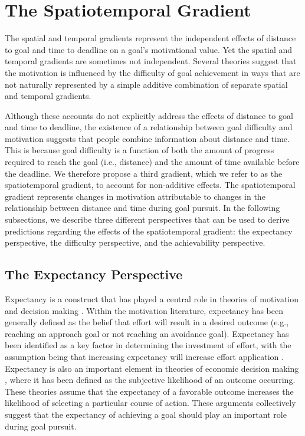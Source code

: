 \documentclass[a4paper,doc,natbib,donotrepeattitle]{apa6}
\begin{document}
\section{The Spatiotemporal Gradient}

The spatial and temporal gradients represent the independent effects of distance to goal and time to deadline on a goal's motivational value. Yet the spatial and temporal gradients are sometimes not independent. Several theories suggest that the motivation is influenced by the difficulty of goal achievement in ways that are not naturally represented by a simple additive combination of separate spatial and temporal gradients.

Although these accounts do not explicitly address the effects of distance to goal and time to deadline, the existence of a relationship between goal difficulty and motivation suggests that people combine information about distance and time. This is because goal difficulty is a function of both the amount of progress required to reach the goal (i.e., distance) and the amount of time available before the deadline. We therefore propose a third gradient, which we refer to as the spatiotemporal gradient, to account for non-additive effects. The spatiotemporal gradient represents changes in motivation attributable to changes in the relationship between distance and time during goal pursuit. In the following subsections, we describe three different perspectives that can be used to derive predictions regarding the effects of the spatiotemporal gradient: the expectancy perspective, the difficulty perspective, and the achievability perspective.

\subsection{The Expectancy Perspective}

Expectancy is a construct that has played a central role in theories of motivation and decision making \citep{Vroom1964,Bandura1977}. Within the motivation literature, expectancy has been generally defined as the belief that effort will result in a desired outcome (e.g., reaching an approach goal or not reaching an avoidance goal). Expectancy has been identified as a key factor in determining the investment of effort, with the assumption being that increasing expectancy will increase effort application \citep{Locke1990,Bandura1977,Vroom1964,Steel2006}. Expectancy is also an important element in theories of economic decision making \citep[e.g.,][]{vonNeumann1947,Luce1957}, where it has been defined as the subjective likelihood of an outcome occurring. These theories assume that the expectancy of a favorable outcome increases the likelihood of selecting a particular course of action. These arguments collectively suggest that the expectancy of achieving a goal should play an important role during goal pursuit.
\end{document}
